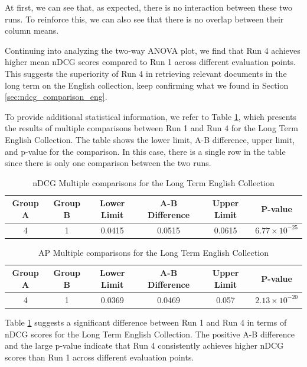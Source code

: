 At first, we can see that, as expected, there is no interaction between these two runs. To reinforce this, we can also see that there is no overlap between their column means.

Continuing into analyzing the two-way \ac{ANOVA} plot, we find that Run 4 achieves higher mean \ac{nDCG} scores compared to Run 1 across different evaluation points. 
This suggests the superiority of Run 4 in retrieving relevant documents in the long term on the English collection, keep confirming what we found in Section \ref{sec:ndcg_comparison_eng}. 

To provide additional statistical information, we refer to Table \ref{table:lt_anova_eng}, which presents the results of multiple comparisons between Run 1 and Run 4 for the Long Term English Collection. 
The table shows the lower limit, A-B difference, upper limit, and p-value for the comparison. 
In this case, there is a single row in the table since there is only one comparison between the two runs.

\begin{table}[!h]
    \centering
    \caption{\ac{nDCG} Multiple comparisons for the Long Term English Collection}
    \label{table:lt_anova_eng}
    \begin{tabular}{cccccc}
    \hline
    Group A & Group B & Lower Limit & A-B Difference & Upper Limit & P-value \\
    \hline
    4 & 1 & 0.0415 & 0.0515 & 0.0615 & $6.77 \times 10^{-25}$ \\
    \hline
    \end{tabular}
\end{table}

\begin{table}[!h]
    \centering
    \caption{\ac{AP} Multiple comparisons for the Long Term English Collection}
    \label{table:lt_anova_eng_ap}
    \begin{tabular}{cccccc}
    \hline
    Group A & Group B & Lower Limit & A-B Difference & Upper Limit & P-value \\
    \hline
    4 & 1 & 0.0369 & 0.0469 & 0.057 & $2.13 \times 10^{-20}$ \\
    \hline
    \end{tabular}
\end{table}
    
Table \ref{table:lt_anova_eng} suggests a significant difference between Run 1 and Run 4 in terms of \ac{nDCG} scores for the Long Term English Collection. 
The positive A-B difference and the large p-value indicate that Run 4 consistently achieves higher \ac{nDCG} scores than Run 1 across different evaluation points.

